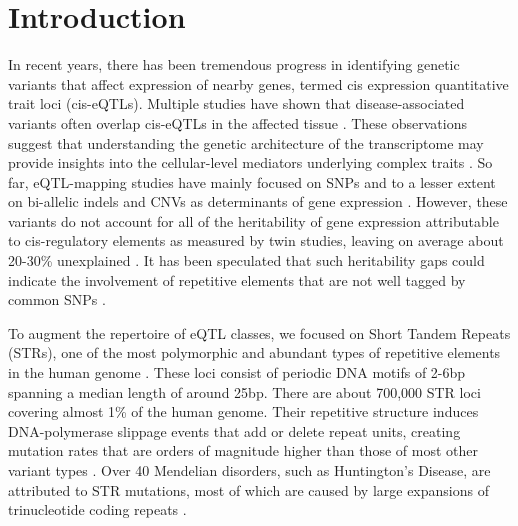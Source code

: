 \section{Introduction}
In recent years, there has been tremendous progress in identifying genetic variants that affect expression of nearby genes, termed cis expression quantitative trait loci (cis-eQTLs). Multiple studies have shown that disease-associated variants often overlap cis-eQTLs in the affected tissue \cite{MoffattKabeschLiangEtAl2007,BarrettHansoulNicolaeEtAl2008,ArdlieDelucaSegreEtAl2015}. These observations suggest that understanding the genetic architecture of the transcriptome may provide insights into the cellular-level mediators underlying complex traits \cite{NicaMontgomeryDimasEtAl2010,NicolaeGamazonZhangEtAl2010,WardKellis2012}. So far, eQTL-mapping studies have mainly focused on SNPs and to a lesser extent on bi-allelic indels and CNVs as determinants of gene expression \cite{StrangerNicaForrestEtAl2007,GrundbergSmallHedmanEtAl2012,LappalainenSammethFriedlanderEtAl2013}. However, these variants do not account for all of the heritability of gene expression attributable to cis-regulatory elements as measured by twin studies, leaving on average about 20-30\% unexplained \cite{GrundbergSmallHedmanEtAl2012,WrightSullivanBrooksEtAl2014}.  It has been speculated that such heritability gaps could indicate the involvement of repetitive elements that are not well tagged by common SNPs \cite{ManolioCollinsCoxEtAl2009,PressCarlsonQueitsch2014}. 

To augment the repertoire of eQTL classes, we focused on Short Tandem Repeats (STRs), one of the most polymorphic and abundant types of repetitive elements in the human genome \cite{Ellegren2004,GemayelVincesLegendreEtAl2010}. These loci consist of periodic DNA motifs of 2-6bp spanning a median length of around 25bp. There are about 700,000 STR loci covering almost 1\% of the human genome. Their repetitive structure induces DNA-polymerase slippage events that add or delete repeat units, creating mutation rates that are orders of magnitude higher than those of most other variant types \cite{WeberWong1993,Ellegren2004}. Over 40 Mendelian disorders, such as Huntington's Disease, are attributed to STR mutations, most of which are caused by large expansions of trinucleotide coding repeats \cite{Mirkin2007}. 

